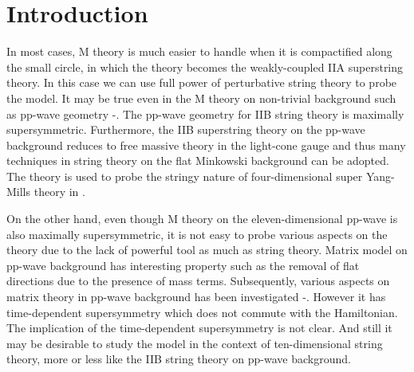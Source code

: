 \documentclass[a4paper,12pt]{article}
\begin{document}
\section{Introduction}
In most cases, M theory is much easier to handle when it is
compactified along the small circle, in which the theory becomes the
weakly-coupled IIA superstring theory. In this case we can use full
power of perturbative string theory to probe the model. It may be true
even in the M theory on non-trivial background such as pp-wave
geometry \cite{kow194}-\cite{bla081}. The pp-wave geometry for IIB
string theory is maximally supersymmetric\cite{bla242}. Furthermore,
the IIB superstring theory on the pp-wave background reduces to free
massive theory in the light-cone gauge \cite{met044} and thus many
techniques in string theory on the flat Minkowski background can be
adopted.  The theory is used to probe the stringy nature of
four-dimensional \coordHE{} super Yang-Mills theory in
\cite{ber021}.

On the other hand, even though M theory on the eleven-dimensional
pp-wave is also maximally supersymmetric, it is not easy to probe
various aspects on the theory due to the lack of powerful tool as much
as string theory. Matrix model on pp-wave background
\cite{ber021,das185} has interesting property such as the removal of
flat directions due to the presence of mass terms. Subsequently,
various aspects on matrix theory in pp-wave background has been
investigated \cite{hyu090}-\cite{sug070}.  However it has
time-dependent supersymmetry which does not commute with the
Hamiltonian.  The implication of the time-dependent supersymmetry is
not clear. And still it may be desirable to study the model in the
context of ten-dimensional string theory, more or less like the IIB
string theory on pp-wave background.
\end{document}
